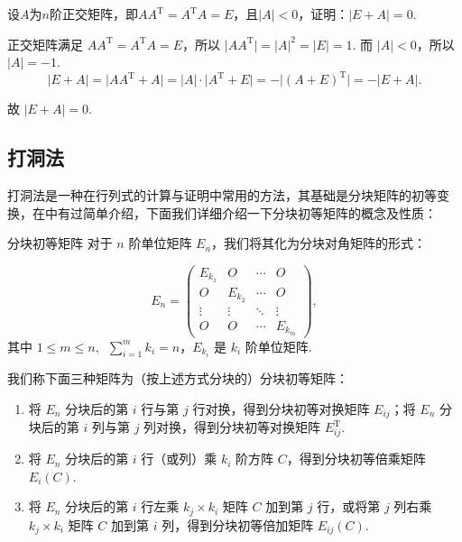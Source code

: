 \begin{example}{}{}
    设$A$为$n$阶正交矩阵，即$AA^\mathrm{T}=A^\mathrm{T}A=E$，且$|A|<0$，证明：$|E+A|=0$.
\end{example}

\begin{solution}
    正交矩阵满足 $AA^{\mathrm{T}} = A^{\mathrm{T}}A = E$，所以 $\lvert AA^{\mathrm{T}} \rvert = \lvert A \rvert^2 = \lvert E \rvert = 1$. 而 $\lvert A \rvert < 0$，所以 $\lvert A \rvert = -1$.
    \[
        \lvert E+A \rvert = \lvert AA^{\mathrm{T}}+A \rvert = \lvert A \rvert \cdot \lvert A^{\mathrm{T}}+E \rvert = -\lvert (A+E)^{\mathrm{T}} \rvert = -\lvert E+A \rvert.
    \]

    故 $\lvert E+A \rvert = 0$.
\end{solution}

\subsection{打洞法}

打洞法是一种在行列式的计算与证明中常用的方法，其基础是分块矩阵的初等变换，在中有过简单介绍，下面我们详细介绍一下分块初等矩阵的概念及性质：

\begin{definition}{}{分块初等矩阵}
    对于 $n$ 阶单位矩阵 $E_n$，我们将其化为分块对角矩阵的形式：

    \[
        E_n = \begin{pmatrix}
            E_{k_1} & O & \cdots & O \\
            O & E_{k_2} & \cdots & O \\
            \vdots & \vdots & \ddots & \vdots \\
            O & O & \cdots & E_{k_m}
        \end{pmatrix},
    \]
    其中 $1 \leqslant m \leqslant n, \enspace \sum\limits_{i=1}^m k_i = n$，$E_{k_i}$ 是 $k_i$ 阶单位矩阵.

    我们称下面三种矩阵为（按上述方式分块的）分块初等矩阵：

    \begin{enumerate}
        \item 将 $E_n$ 分块后的第 $i$ 行与第 $j$ 行对换，得到分块初等对换矩阵 $E_{ij}$；将 $E_n$ 分块后的第 $i$ 列与第 $j$ 列对换，得到分块初等对换矩阵 $E_{ij}^{\mathrm{T}}$.
        \item 将 $E_n$ 分块后的第 $i$ 行（或列）乘 $k_i$ 阶方阵 $C$，得到分块初等倍乘矩阵 $E_i(C)$.
        \item 将 $E_n$ 分块后的第 $i$ 行左乘 $k_j \times k_i$ 矩阵 $C$ 加到第 $j$ 行，或将第 $j$ 列右乘 $k_j \times k_i$ 矩阵 $C$ 加到第 $i$ 列，得到分块初等倍加矩阵 $E_{ij}(C)$.
    \end{enumerate}
\end{definition}

